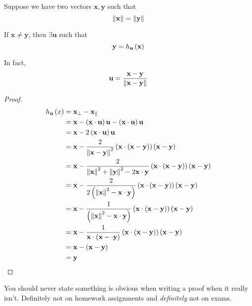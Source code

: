 \documentclass[11pt]{article}
\begin{document}
\begin{lemma}
  
  Suppose we have two vectors $\bm{x}, \bm{y}$ such that
  $$
  \left\lVert\textbf{x}\right\rVert = \left\lVert\textbf{y}\right\rVert
  $$

  If $\bm{x} \neq \bm{y}$, then $\exists \bm{u}$ such that
  $$
  \textbf{y} = h_{\textbf{u}} \left ( \textbf{x} \right)
  $$

  In fact,
  $$
  \textbf{u} = \frac{\textbf{x} - \textbf{y}}{\left\lVert\textbf{x} - \textbf{y}\right\rVert}
  $$

  \begin{proof}
    \begin{align*}
      h_{\textbf{u}} \left ( x \right) &= \textbf{x}_{\perp} - \textbf{x}_{\parallel} \\
                          &= \textbf{x} - \left ( \textbf{x} \cdot \textbf{u} \right) \textbf{u} - \left ( \textbf{x} \cdot \textbf{u} \right) \textbf{u} \\
                          &= \textbf{x} - 2 \left ( \textbf{x} \cdot \textbf{u} \right) \textbf{u} \\
                          &= \textbf{x} - \frac{2}{\left\lVert\textbf{x} - \textbf{y}\right\rVert^2} \left ( \textbf{x} \cdot \left ( \textbf{x} - \textbf{y} \right) \right) \left ( \textbf{x} - \textbf{y} \right) \\
                          &= \textbf{x} - \frac{2}{\left\lVert\textbf{x}\right\rVert^2 + \left\lVert\textbf{y}\right\rVert^2 - 2 \textbf{x} \cdot \textbf{y}} \left ( \textbf{x} \cdot \left ( \textbf{x} - \textbf{y} \right) \right) \left ( \textbf{x} - \textbf{y} \right) \\
                          &= \textbf{x} - \frac{2}{2 \left ( \left\lVert\textbf{x}\right\rVert^2 -  \textbf{x} \cdot \textbf{y} \right)} \left ( \textbf{x} \cdot \left ( \textbf{x} - \textbf{y} \right) \right) \left ( \textbf{x} - \textbf{y} \right) \\
                          &= \textbf{x} - \frac{1}{ \left ( \left\lVert\textbf{x}\right\rVert^2 -  \textbf{x} \cdot \textbf{y} \right)} \left ( \textbf{x} \cdot \left ( \textbf{x} - \textbf{y} \right) \right) \left ( \textbf{x} - \textbf{y} \right) \\
                          &= \textbf{x} - \frac{1}{ \textbf{x}  \cdot \left (  \textbf{x} - \cdot \textbf{y}  \right)} \left ( \textbf{x} \cdot \left ( \textbf{x} - \textbf{y} \right) \right) \left ( \textbf{x} - \textbf{y} \right) \\
                          &= \textbf{x} - \left ( \textbf{x} - \textbf{y} \right) \\
                          &= \textbf{y} \\
    \end{align*}
  \end{proof}
\end{lemma}

\begin{remark}
  
  You should never state something is obvious when writing a proof when it really isn't.
  Definitely not on homework assignments and \emph{definitely} not on exams.
\end{remark}
\end{document}

